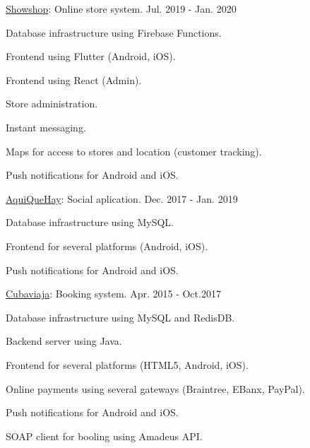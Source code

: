 \begin{cventries}
  \cventry
    {\href{https://showshop.app/}{Showshop}: Online store system.} %
    {} %
    {} %
    {Jul. 2019 - Jan. 2020} %
    {
      \begin{cvitems} %
        \item {Database infrastructure using Firebase Functions.}
        \item {Frontend using Flutter (Android, iOS).}
        \item {Frontend using React (Admin).}
        \item {Store administration.}
        \item {Instant messaging.}
        \item {Maps for access to stores and location (customer tracking).}
        \item {Push notifications for Android and iOS.}
      \end{cvitems}
    }

  \cventry
    {\href{https://aquiquehay.com.ec/}{AquiQueHay}: Social aplication.} %
    {} %
    {} %
    {Dec. 2017 - Jan. 2019} %
    {
      \begin{cvitems} %
        \item {Database infrastructure using MySQL.}
        \item {Frontend for several platforms (Android, iOS).}
        \item {Push notifications for Android and iOS.}
      \end{cvitems}
    }

  \cventry
    {\href{https://www.cuballama.com/viajes/vuelos}{Cubaviaja}: Booking system.} %
    {} %
    {} %
    {Apr. 2015 - Oct.2017} %
    {
      \begin{cvitems} %
        \item {Database infrastructure using MySQL and RedisDB.}
        \item {Backend server using Java.}
        \item {Frontend for several platforms (HTML5, Android, iOS).}
        \item {Online payments using several gateways (Braintree, EBanx, PayPal).}
        \item {Push notifications for Android and iOS.}
        \item {SOAP client for booling using Amadeus API.}
      \end{cvitems}
    }


\end{cventries}
